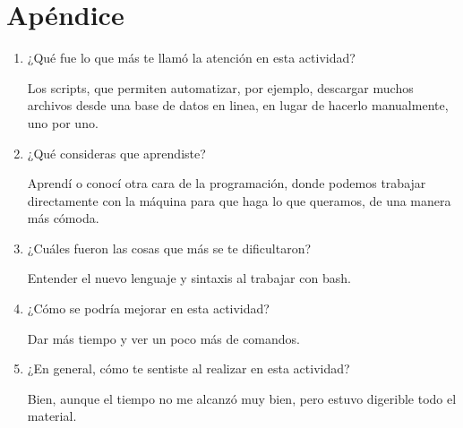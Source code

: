 \documentclass[a4paper]{article}
\begin{document}
\section{Apéndice}

\begin{enumerate}
\item ¿Qué fue lo que más te llamó la atención en esta actividad?

Los scripts, que permiten automatizar, por ejemplo, descargar muchos archivos desde una base de datos en linea, en lugar de hacerlo manualmente, uno por uno.

\item ¿Qué consideras que aprendiste?

Aprendí o conocí otra cara de la programación, donde podemos trabajar directamente con la máquina para que haga lo que queramos, de una manera más cómoda.

\item ¿Cuáles fueron las cosas que más se te dificultaron?

Entender el nuevo lenguaje y sintaxis al trabajar con bash.

\item ¿Cómo se podría mejorar en esta actividad?

Dar más tiempo y ver un poco más de comandos. 

\item ¿En general, cómo te sentiste al realizar en esta actividad? 

Bien, aunque el tiempo no me alcanzó muy bien, pero estuvo digerible todo el material.

\end{enumerate}
\end{document}
